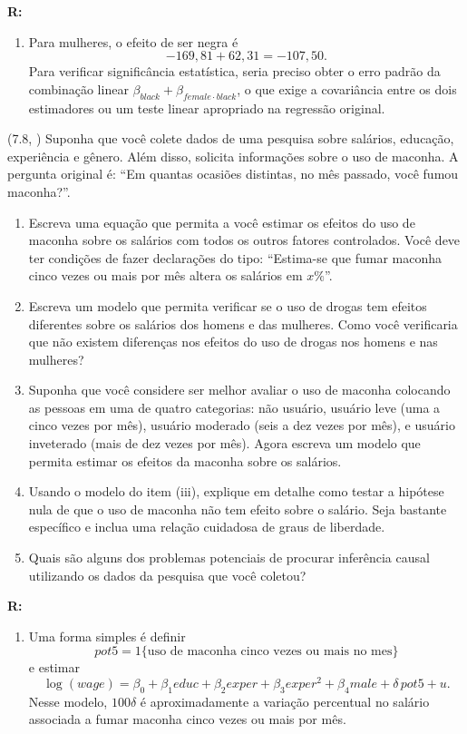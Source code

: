 \documentclass[12pt,letterpaper, onecolumn]{exam}
\renewenvironment{solution}
{\par\noindent\textbf{R:}\enspace\color{blue}}
{\par\color{black}}
\begin{document}
\begin{questions}
\begin{solution}
\begin{enumerate}[label=(\roman*)]
    \item Para mulheres, o efeito de ser negra é
    \[
    -169,81 + 62,31 = -107,50.
    \]
    Para verificar significância estatística, seria preciso obter o erro padrão da combinação linear \(\beta_{black}+\beta_{female\cdot black}\), o que exige a covariância entre os dois estimadores ou um teste linear apropriado na regressão original.
\end{enumerate}
\end{solution}

\vspace{0.7cm}

\question (7.8, \citep{wooldridge2016}) Suponha que você colete dados de uma pesquisa sobre salários, educação, experiência e gênero. Além disso, solicita informações sobre o uso de maconha. A pergunta original é: ``Em quantas ocasiões distintas, no mês passado, você fumou maconha?''.
\begin{enumerate}[label=(\roman*)]
    \item Escreva uma equação que permita a você estimar os efeitos do uso de maconha sobre os salários com todos os outros fatores controlados. Você deve ter condições de fazer declarações do tipo: ``Estima-se que fumar maconha cinco vezes ou mais por mês altera os salários em \(x\%\)''.
    \item Escreva um modelo que permita verificar se o uso de drogas tem efeitos diferentes sobre os salários dos homens e das mulheres. Como você verificaria que não existem diferenças nos efeitos do uso de drogas nos homens e nas mulheres?
    \item Suponha que você considere ser melhor avaliar o uso de maconha colocando as pessoas em uma de quatro categorias: não usuário, usuário leve (uma a cinco vezes por mês), usuário moderado (seis a dez vezes por mês), e usuário inveterado (mais de dez vezes por mês). Agora escreva um modelo que permita estimar os efeitos da maconha sobre os salários.
    \item Usando o modelo do item (iii), explique em detalhe como testar a hipótese nula de que o uso de maconha não tem efeito sobre o salário. Seja bastante específico e inclua uma relação cuidadosa de graus de liberdade.
    \item Quais são alguns dos problemas potenciais de procurar inferência causal utilizando os dados da pesquisa que você coletou?
\end{enumerate}

\begin{solution}
\begin{enumerate}[label=(\roman*)]
    \item Uma forma simples é definir
    \[
    pot5 = 1\{\text{uso de maconha cinco vezes ou mais no mes}\}
    \]
    e estimar
    \[
    \log(wage)=\beta_0+\beta_1 educ+\beta_2 exper+\beta_3 exper^2+\beta_4 male+\delta\,pot5+u.
    \]
    Nesse modelo, \(100\delta\) é aproximadamente a variação percentual no salário associada a fumar maconha cinco vezes ou mais por mês.


\end{enumerate}
\end{solution}
\end{questions}
\end{document}
